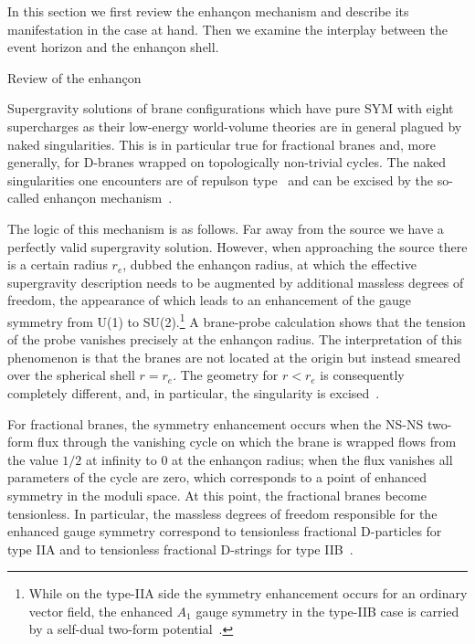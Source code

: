 \documentclass[a4paper,11pt]{article}
\makeatletter
\renewcommand{\subsection}{\@startsection{subsection}{2}{\z@} {-3.25ex
plus -1ex minus -.2ex}{1.5ex plus .2ex}{\normalsize\bf}}
\makeatother
\begin{document}
In this section we first review the enhan\c{c}on mechanism and
describe its manifestation in the case at hand. Then we examine the
interplay between the event horizon and the enhan\c{c}on shell.

\subsection{Review of the enhan\c{c}on}

Supergravity solutions of brane configurations which have pure SYM
with eight supercharges as their low-energy world-volume theories are
in general plagued by naked singularities. This is in particular true
for fractional branes and, more generally, for D-branes wrapped on
topologically non-trivial cycles. The naked singularities one
encounters are of repulson
type~\cite{Behrndt:1995tr,Cvetic:1995mx,Kallosh:1995yz} and can be
excised by the so-called enhan\c{c}on mechanism~\cite{Johnson:1999qt}.

The logic of this mechanism is as follows. Far away from the source we 
have a perfectly valid supergravity solution. However, when approaching 
the source there is a certain radius $r_e$, dubbed the enhan\c{c}on radius, 
at which the effective supergravity description needs to be augmented by 
additional massless degrees of freedom, the appearance of which leads to 
an enhancement of the gauge symmetry from U(1) to SU(2).\footnote{While 
on the type-IIA side the symmetry enhancement occurs for an ordinary 
vector field, the enhanced $A_1$ gauge symmetry in the type-IIB case 
is carried by a self-dual two-form potential~\cite{Witten:1995zh}.}
A brane-probe calculation shows that the tension of the probe vanishes 
precisely at the enhan\c{c}on radius. The interpretation of this phenomenon 
is that the branes are not located at the origin but instead smeared over
the spherical shell $r=r_e$. The geometry for $r<r_e$ is consequently 
completely different, and, in particular, the singularity is
excised~\cite{Johnson:1999qt,Johnson:2001wm}.

For fractional branes, the symmetry enhancement occurs when the NS-NS 
two-form flux through the vanishing cycle on which the brane is wrapped
flows from the value $1/2$ at infinity to $0$ at the enhan\c{c}on radius; 
when the flux vanishes all parameters of the cycle are zero, which 
corresponds to a point of enhanced symmetry in the moduli space. 
At this point, the fractional branes become tensionless. In particular,
the massless degrees of freedom responsible for the enhanced gauge
symmetry correspond to tensionless fractional D-particles for type IIA
and to tensionless fractional D-strings for type IIB~\cite{Johnson:2000ch}.
\end{document}
